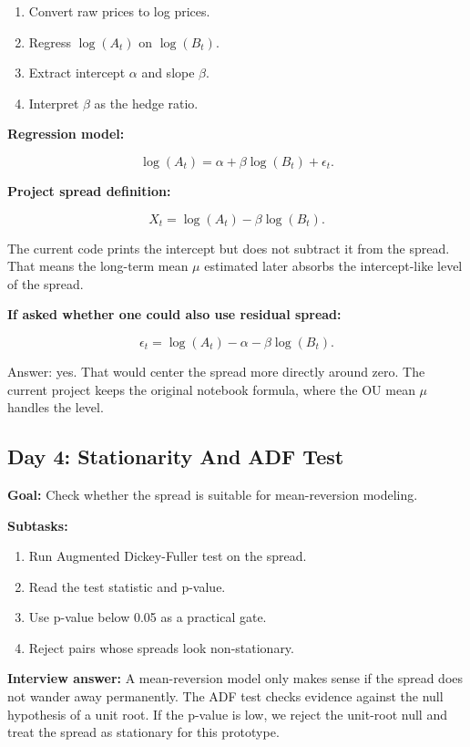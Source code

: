 \documentclass[11pt]{article}
\begin{document}
\begin{enumerate}
  \item Convert raw prices to log prices.
  \item Regress $\log(A_t)$ on $\log(B_t)$.
  \item Extract intercept $\alpha$ and slope $\beta$.
  \item Interpret $\beta$ as the hedge ratio.
\end{enumerate}

\textbf{Regression model:}

\[
\log(A_t) = \alpha + \beta \log(B_t) + \epsilon_t.
\]

\textbf{Project spread definition:}

\[
X_t = \log(A_t) - \beta \log(B_t).
\]

The current code prints the intercept but does not subtract it from the spread.
That means the long-term mean $\mu$ estimated later absorbs the intercept-like
level of the spread.

\textbf{If asked whether one could also use residual spread:}

\[
\epsilon_t = \log(A_t) - \alpha - \beta \log(B_t).
\]

Answer: yes. That would center the spread more directly around zero. The current
project keeps the original notebook formula, where the OU mean $\mu$ handles the
level.

\subsection{Day 4: Stationarity And ADF Test}

\textbf{Goal:} Check whether the spread is suitable for mean-reversion modeling.

\textbf{Subtasks:}

\begin{enumerate}
  \item Run Augmented Dickey-Fuller test on the spread.
  \item Read the test statistic and p-value.
  \item Use p-value below 0.05 as a practical gate.
  \item Reject pairs whose spreads look non-stationary.
\end{enumerate}

\textbf{Interview answer:} A mean-reversion model only makes sense if the spread
does not wander away permanently. The ADF test checks evidence against the null
hypothesis of a unit root. If the p-value is low, we reject the unit-root null
and treat the spread as stationary for this prototype.
\end{document}
